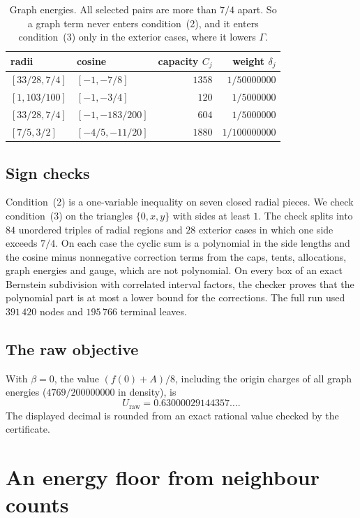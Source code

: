 \documentclass[11pt]{amsart}
\numberwithin{equation}{section}
\theoremstyle{remark}
\newcommand{\Gam}{\Gamma}
\begin{document}
\begin{table}[ht]
\caption{Graph energies. All selected pairs are more than $7/4$ apart. So a graph term never enters condition~(2), and it enters condition~(3) only in the exterior cases, where it lowers $\Gam$.}\label{tab:graphs}
\centering
\begin{tabular}{llrr}
\toprule
radii & cosine & capacity $C_j$ & weight $\delta_j$\\
\midrule
$[33/28,7/4]$ & $[-1,-7/8]$ & $1358$ & $1/50000000$\\
$[1,103/100]$ & $[-1,-3/4]$ & $120$ & $1/5000000$\\
$[33/28,7/4]$ & $[-1,-183/200]$ & $604$ & $1/5000000$\\
$[7/5,3/2]$ & $[-4/5,-11/20]$ & $1880$ & $1/100000000$\\
\bottomrule
\end{tabular}
\end{table}

\subsection*{Sign checks}
Condition~(2) is a one-variable inequality on seven closed radial pieces. We check condition~(3) on the triangles $\{0,x,y\}$ with sides at least $1$. The check splits into $84$ unordered triples of radial regions and $28$ exterior cases in which one side exceeds $7/4$. On each case the cyclic sum is a polynomial in the side lengths and the cosine minus nonnegative correction terms from the caps, tents, allocations, graph energies and gauge, which are not polynomial. On every box of an exact Bernstein subdivision with correlated interval factors, the checker proves that the polynomial part is at most a lower bound for the corrections. The full run used $391\,420$ nodes and $195\,766$ terminal leaves.

\subsection*{The raw objective}
With $\beta=0$, the value $(f(0)+A)/8$, including the origin charges of all graph energies ($4769/200000000$ in density), is
\[
U_{\mathrm{raw}}=0.63000029144357\ldots.
\]
The displayed decimal is rounded from an exact rational value checked by the certificate.

\section{An energy floor from neighbour counts}\label{sec:counts}
\end{document}
